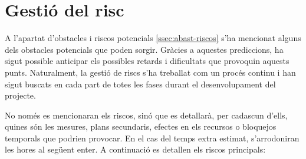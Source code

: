 \section{Gestió del risc} \label{sec:gestio_risc}
A l'apartat d'obstacles i riscos potencials \ref{ssec:abast-riscos} s'ha mencionat alguns dels obstacles potencials que poden sorgir. Gràcies a aquestes prediccions, ha sigut possible anticipar els possibles retards i dificultats que provoquin aquests punts. Naturalment, la gestió de riscs s'ha treballat com un procés continu i han sigut buscats en cada part de totes les fases durant el desenvolupament del projecte.

No només es mencionaran els riscos, sinó que es detallarà, per cadascun d'ells, quines són les mesures, plans secundaris, efectes en els recursos o bloquejos temporals que podrien provocar. En el cas del temps extra estimat, s'arrodoniran les hores al següent enter. A continuació es detallen els riscos principals:


